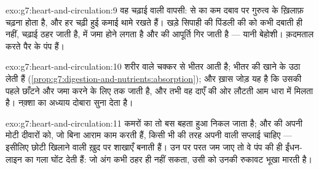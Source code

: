 \begin{solution}{exo:g7:heart-and-circulation:9}
वह चढ़ाई वाली वापसी:  से  का  कम दबाव पर गुरुत्व के
ख़िलाफ़ चढ़ना होता है, और  हर चढ़ी हुई कमाई थामे रखते हैं।  खड़े
सिपाही की पिंडली की   को कभी दबाती ही नहीं, चढ़ाई ठहर जाती
है,   में जमा होने लगता है और  की आपूर्ति गिर जाती है
--- यानी बेहोशी। क़दमताल करते पैर  के पंप हैं।
\end{solution}

\begin{solution}{exo:g7:heart-and-circulation:10}
शरीर वाले चक्कर से  भीतर आती है; भीतर  की  खाने के
 उठा लेती हैं
(\cref{prop:g7:digestion-and-nutrients:absorption}); और ख़ास जोड़ यह है
कि उसकी  पहले छाँटने और जमा करने के लिए  तक जाती है, और तभी वह
 दाएँ  की ओर लौटती आम धारा में मिलता है। नक़्शा  का अध्याय
दोबारा सुना देता है।
\end{solution}

\begin{solution}{exo:g7:heart-and-circulation:11}
कमरों का  तो बस बहता हुआ निकल जाता है; और  की अपनी मोटी दीवारों
को, जो बिना आराम काम करती हैं, किसी भी  की तरह अपनी  वाली
सप्लाई चाहिए --- इसीलिए छोटी खिलाने वाली  ख़ुद  पर शाखाएँ
बनाती हैं। उन पर परत जम जाए तो वे पंप की ही ईंधन-लाइन का गला घोंट देती
हैं: जो अंग कभी ठहर ही नहीं सकता, उसी को उनकी रुकावट भूखा मारती है।
\end{solution}

